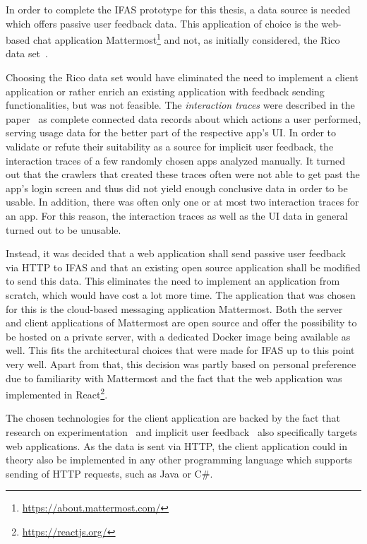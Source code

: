 In order to complete the \ac{IFAS} prototype for this thesis, a data source is needed which offers passive user feedback data.
This application of choice is the web-based chat application Mattermost\footnote{\url{https://about.mattermost.com/}} and not, as initially considered, the Rico data set~\cite{Deka:2017:Rico}.

Choosing the Rico data set would have eliminated the need to implement a client application or rather enrich an existing application with feedback sending functionalities, but was not feasible.
The \emph{interaction traces} were described in the paper~\cite{Deka:2017:Rico} as complete connected data records about which actions a user performed, serving usage data for the better part of the respective app's \ac{UI}.
In order to validate or refute their suitability as a source for implicit user feedback, the interaction traces of a few randomly chosen apps analyzed manually.
It turned out that the crawlers that created these traces often were not able to get past the app's login screen and thus did not yield enough conclusive data in order to be usable.
In addition, there was often only one or at most two interaction traces for an app.
For this reason, the interaction traces as well as the \ac{UI} data in general turned out to be unusable.

Instead, it was decided that a web application shall send passive user feedback via \ac{HTTP} to \ac{IFAS} and that an existing open source application shall be modified to send this data.
This eliminates the need to implement an application from scratch, which would have cost a lot more time.
The application that was chosen for this is the cloud-based messaging application Mattermost.
Both the server and client applications of Mattermost are open source and offer the possibility to be hosted on a private server, with a dedicated Docker image being available as well.
This fits the architectural choices that were made for \ac{IFAS} up to this point very well.
Apart from that, this decision was partly based on personal preference due to familiarity with Mattermost and the fact that the web application was implemented in React\footnote{\url{https://reactjs.org/}}.

The chosen technologies for the client application are backed by the fact that research on experimentation~\cite{Dmitriev2017,Kohavi2013a} and implicit user feedback~\cite{Joachims2005,Huang2011} also specifically targets web applications.
As the data is sent via \ac{HTTP}, the client application could in theory also be implemented in any other programming language which supports sending of \ac{HTTP} requests, such as Java or C\#.

